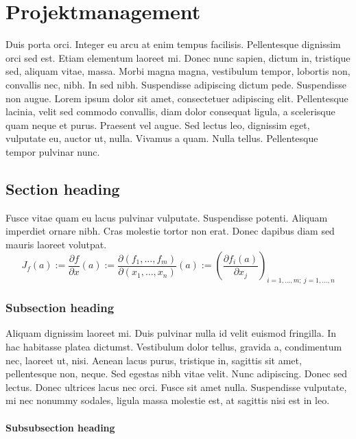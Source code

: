 
\chapter{Projektmanagement}

Duis porta orci. Integer eu arcu at enim tempus facilisis. Pellentesque dignissim orci sed est. Etiam elementum laoreet mi. Donec nunc sapien, dictum in, tristique sed, aliquam vitae, massa. Morbi magna magna, vestibulum tempor, lobortis non, convallis nec, nibh. In sed nibh. Suspendisse adipiscing dictum pede. Suspendisse non augue. Lorem ipsum dolor sit amet, consectetuer adipiscing elit. Pellentesque lacinia, velit sed commodo convallis, diam dolor consequat ligula, a scelerisque quam neque et purus. Praesent vel augue. Sed lectus leo, dignissim eget, vulputate eu, auctor ut, nulla. Vivamus a quam. Nulla tellus. Pellentesque tempor pulvinar nunc.


\section{Section heading}

Fusce vitae quam eu lacus pulvinar vulputate. Suspendisse potenti. Aliquam imperdiet ornare nibh. Cras molestie tortor non erat. Donec dapibus diam sed mauris laoreet volutpat. 
%
\begin{equation}
  J_f(a) := \frac{\partial {f}}{\partial {x}}(a) 
         := \frac{\partial(f_1,  \ldots, f_m)}{\partial(x_1, \ldots, x_n)}(a)
         := \left(\frac{\partial f_i(a)}{\partial x_j}\right)_{i=1,\ldots,m;\
             j=1,\ldots,n}
\end{equation}

\subsection{Subsection heading}

Aliquam dignissim laoreet mi. Duis pulvinar nulla id velit euismod fringilla. In hac habitasse platea dictumst. Vestibulum dolor tellus, gravida a, condimentum nec, laoreet ut, nisi. Aenean lacus purus, tristique in, sagittis sit amet, pellentesque non, neque. Sed egestas nibh vitae velit. Nunc adipiscing. Donec sed lectus. Donec ultrices lacus nec orci. Fusce sit amet nulla. Suspendisse vulputate, mi nec nonummy sodales, ligula massa molestie est, at sagittis nisi est in leo.

\subsubsection{Subsubsection heading}

